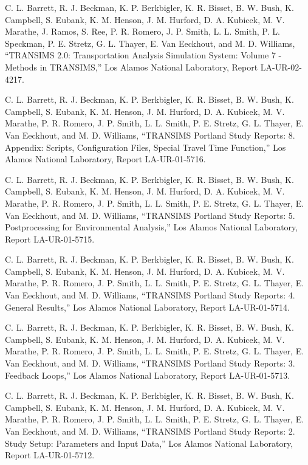 \documentclass[]{article}
\begin{document}
C. L. Barrett, R. J. Beckman, K. P. Berkbigler, K. R. Bisset, B. W.
Bush, K. Campbell, S. Eubank, K. M. Henson, J. M. Hurford, D. A.
Kubicek, M. V. Marathe, J. Ramos, S. Ree, P. R. Romero, J. P. Smith, L.
L. Smith, P. L. Speckman, P. E. Stretz, G. L. Thayer, E. Van Eeckhout,
and M. D. Williams, ``TRANSIMS 2.0: Transportation Analysis Simulation
System: Volume 7 - Methods in TRANSIMS,'' Los Alamos National
Laboratory, Report LA-UR-02-4217.

C. L. Barrett, R. J. Beckman, K. P. Berkbigler, K. R. Bisset, B. W.
Bush, K. Campbell, S. Eubank, K. M. Henson, J. M. Hurford, D. A.
Kubicek, M. V. Marathe, P. R. Romero, J. P. Smith, L. L. Smith, P. E.
Stretz, G. L. Thayer, E. Van Eeckhout, and M. D. Williams, ``TRANSIMS
Portland Study Reports: 8. Appendix: Scripts, Configuration Files,
Special Travel Time Function,'' Los Alamos National Laboratory, Report
LA-UR-01-5716.

C. L. Barrett, R. J. Beckman, K. P. Berkbigler, K. R. Bisset, B. W.
Bush, K. Campbell, S. Eubank, K. M. Henson, J. M. Hurford, D. A.
Kubicek, M. V. Marathe, P. R. Romero, J. P. Smith, L. L. Smith, P. E.
Stretz, G. L. Thayer, E. Van Eeckhout, and M. D. Williams, ``TRANSIMS
Portland Study Reports: 5. Postprocessing for Environmental Analysis,''
Los Alamos National Laboratory, Report LA-UR-01-5715.

C. L. Barrett, R. J. Beckman, K. P. Berkbigler, K. R. Bisset, B. W.
Bush, K. Campbell, S. Eubank, K. M. Henson, J. M. Hurford, D. A.
Kubicek, M. V. Marathe, P. R. Romero, J. P. Smith, L. L. Smith, P. E.
Stretz, G. L. Thayer, E. Van Eeckhout, and M. D. Williams, ``TRANSIMS
Portland Study Reports: 4. General Results,'' Los Alamos National
Laboratory, Report LA-UR-01-5714.

C. L. Barrett, R. J. Beckman, K. P. Berkbigler, K. R. Bisset, B. W.
Bush, K. Campbell, S. Eubank, K. M. Henson, J. M. Hurford, D. A.
Kubicek, M. V. Marathe, P. R. Romero, J. P. Smith, L. L. Smith, P. E.
Stretz, G. L. Thayer, E. Van Eeckhout, and M. D. Williams, ``TRANSIMS
Portland Study Reports: 3. Feedback Loops,'' Los Alamos National
Laboratory, Report LA-UR-01-5713.

C. L. Barrett, R. J. Beckman, K. P. Berkbigler, K. R. Bisset, B. W.
Bush, K. Campbell, S. Eubank, K. M. Henson, J. M. Hurford, D. A.
Kubicek, M. V. Marathe, P. R. Romero, J. P. Smith, L. L. Smith, P. E.
Stretz, G. L. Thayer, E. Van Eeckhout, and M. D. Williams, ``TRANSIMS
Portland Study Reports: 2. Study Setup: Parameters and Input Data,'' Los
Alamos National Laboratory, Report LA-UR-01-5712.
\end{document}
